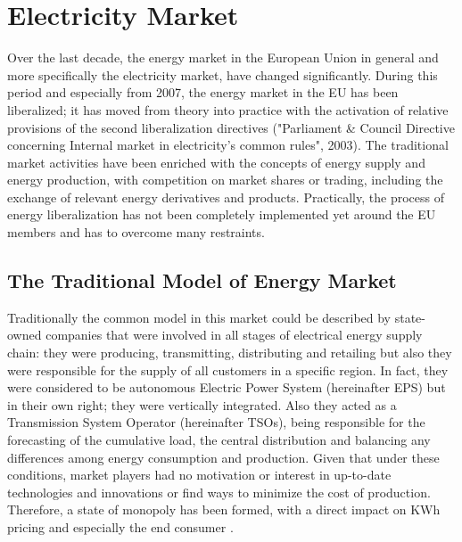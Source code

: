 \chapter{Electricity Market}
\par Over the last decade, the energy market in the European Union in general and more specifically the electricity market, have changed significantly. During this period and especially from 2007, the energy market in the EU has been liberalized; it has moved from theory into practice with the activation of relative provisions of the second liberalization directives ("Parliament & Council Directive concerning Internal market in electricity's common rules", 2003). The traditional market activities have been enriched with the concepts of energy supply and energy production, with competition on market shares or trading, including the exchange of relevant energy derivatives and products. Practically, the process of energy liberalization has not been completely implemented yet around the EU members and has to overcome many restraints.    
\section{The Traditional Model of Energy Market}
Traditionally the common model in this market could be described by state-owned companies that were involved in all stages of electrical energy supply chain: they were producing, transmitting, distributing and retailing but also they were responsible for the supply of all customers in a specific region. In fact, they were considered to be autonomous Electric Power System (hereinafter EPS) but in their own right; they were vertically integrated. Also they acted as a Transmission System Operator (hereinafter TSOs), being responsible for the forecasting of the cumulative load, the central distribution and balancing any differences among energy consumption and production. Given that under these conditions, market players had no motivation or interest in up-to-date technologies and innovations or find ways to minimize the cost of production. Therefore, a state of monopoly has been formed, with a direct impact on KWh pricing and especially the end consumer \cite{ecom}.  
